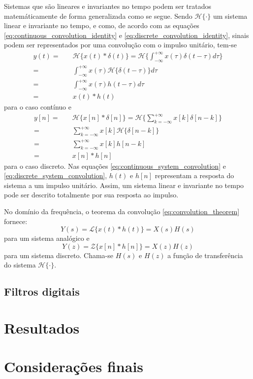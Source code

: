 \documentclass[12pt,a4paper]{report}
\begin{document}
  Sistemas que são lineares e invariantes no tempo podem ser tratados matemáticamente de forma generalizada como
  se segue. Sendo $\mathcal{H}\{\cdot\}$ um sistema linear e invariante no tempo, e como, de acordo com as
  equações \ref{eq:continuous_convolution_identity} e \ref{eq:discrete_convolution_identity}, sinais podem ser
  representados por uma convolução com o impulso unitário, tem-se
  \begin{equation}
    \label{eq:continuous_system_convolution}
    \begin{split}
      y(t) = &\quad \mathcal{H}\{x(t) \ast \delta(t)\}
      = \mathcal{H}\{\int_{-\infty}^{+\infty} x(\tau) \delta(t - \tau) d\tau\}
      \\ = &\quad \int_{-\infty}^{+\infty} x(\tau) \mathcal{H}\{\delta(t - \tau)\} d\tau
      \\ = &\quad \int_{-\infty}^{+\infty} x(\tau) h(t - \tau) d\tau
      \\ = &\quad x(t) \ast h(t)
    \end{split}
  \end{equation}
  para o caso contínuo e
  \begin{equation}
    \label{eq:discrete_system_convolution}
    \begin{split}
      y[n] = &\quad \mathcal{H}\{x[n] \ast \delta[n]\}
      = \mathcal{H}\{\sum_{k = -\infty}^{+\infty} x[k] \delta[n - k]\}
      \\ = &\quad \sum_{k = -\infty}^{+\infty} x[k] \mathcal{H}\{\delta[n - k]\}
      \\ = &\quad \sum_{k = -\infty}^{+\infty} x[k] h[n - k]
      \\ = &\quad x[n] \ast h[n]
  \end{split}
  \end{equation}
  para o caso discreto. Nas equações \ref{eq:continuous_system_convolution} e
  \ref{eq:discrete_system_convolution}, $h(t)$ e $h[n]$ representam a resposta do sistema a um impulso unitário.
  Assim, um sistema linear e invariante no tempo pode ser descrito totalmente por sua resposta ao impulso.

  No domínio da frequência, o teorema da convolução \ref{eq:convolution_theorem} fornece:
  \begin{equation}
    Y(s) = \mathcal{L}\{x(t) \ast h(t)\} = X(s) H(s)
  \end{equation}
  para um sistema analógico e
  \begin{equation}
    Y(z) = \mathcal{Z}\{x[n] \ast h[n]\} = X(z) H(z)
  \end{equation}
  para um sistema discreto. Chama-se $H(s)$ e $H(z)$ a função de transferência do sistema $\mathcal{H\{\cdot}\}$.
\section{Filtros digitais}
\chapter{Resultados}
\chapter{Considerações finais}
\printbibliography
\end{document}

